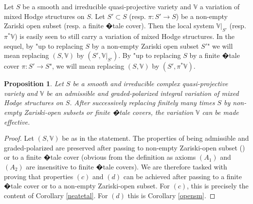 \documentclass[10pt]{article}
\numberwithin{equation}{subsection}
\theoremstyle{plain}
\newtheorem{proposition}[theorem]{Proposition}
\theoremstyle{definition}
\theoremstyle{remark}
\newcommand{\V}{\mathbb V}
\begin{document}
Let $S$ be a smooth and irreducible quasi-projective variety and $\V$ a variation of mixed Hodge structures on $S$. Let $S' \subset S$ (resp. $\pi : S' \rightarrow S$) be a non-empty Zariski open subset (resp. a finite �tale cover). Then the local system $\V \vert_{S'}$ (resp. $\pi^\ast \V$) is easily seen to still carry a variation of mixed Hodge structures. In the sequel, by "up to replacing $S$ by a non-empty Zariski open subset $S'$" we will mean replacing $(S, \V)$ by $(S', \V\vert_{S'})$. By "up to replacing $S$ by a finite �tale cover $\pi : S' \rightarrow S$", we will mean replacing $(S, \V)$ by $(S', \pi^\ast \V)$.
\begin{proposition}\label{pbeff}
Let $S$ be a smooth and irreducible complex quasi-projective variety and $\V$ be an admissible and graded-polarized integral variation of mixed Hodge structures on $S$. After successively replacing finitely many times $S$ by non-empty Zariski-open subsets or finite �tale covers, the variation $\V$ can be made effective.
\end{proposition}
\begin{proof}
Let $(S,\V)$ be as in the statement. The properties of being admissible and graded-polarized are preserved after passing to non-empty Zariski-open subset (\cite[Lem. 3.5]{gao15}) or to a finite �tale cover (obvious from the definition as axioms $(A_1)$ and $(A_2)$ are insensitive to finite �tale covers). We are therefore tasked with proving that properties $(c)$ and $(d)$ can be achieved after passing to a finite �tale cover or to a non-empty Zariski-open subset. For $(c)$, this is precisely the content of Corollary \ref{neatetal}. For $(d)$ this is Corollary \ref{opensm}.
\end{proof}
\end{document}

